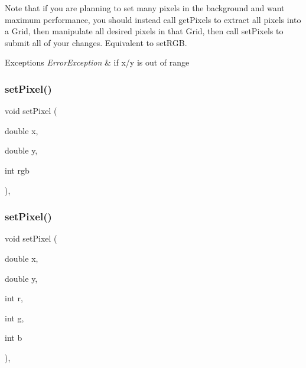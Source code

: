 Note that if you are planning to set many pixels in the background and want maximum performance, you should instead call get\+Pixels to extract all pixels into a Grid, then manipulate all desired pixels in that Grid, then call set\+Pixels to submit all of your changes. Equivalent to set\+R\+GB.


\begin{DoxyExceptions}{Exceptions}
{\em Error\+Exception} & if x/y is out of range \\
\hline
\end{DoxyExceptions}
\mbox{\label{classGForwardDrawingSurface_a05b3441e912e4c0ed45e9ed43bb745d1}} 
\subsubsection{\texorpdfstring{set\+Pixel()}{setPixel()}\hspace{0.1cm}{\footnotesize\ttfamily [2/3]}}
{\footnotesize\ttfamily void set\+Pixel (\begin{DoxyParamCaption}\item[{double}]{x,  }\item[{double}]{y,  }\item[{int}]{rgb }\end{DoxyParamCaption})\hspace{0.3cm}{\ttfamily [override]}, {\ttfamily [inherited]}}

\mbox{\label{classGForwardDrawingSurface_a92c3e3ef930ae7742ad384af28aac241}} 
\subsubsection{\texorpdfstring{set\+Pixel()}{setPixel()}\hspace{0.1cm}{\footnotesize\ttfamily [3/3]}}
{\footnotesize\ttfamily void set\+Pixel (\begin{DoxyParamCaption}\item[{double}]{x,  }\item[{double}]{y,  }\item[{int}]{r,  }\item[{int}]{g,  }\item[{int}]{b }\end{DoxyParamCaption})\hspace{0.3cm}{\ttfamily [override]}, {\ttfamily [inherited]}}

